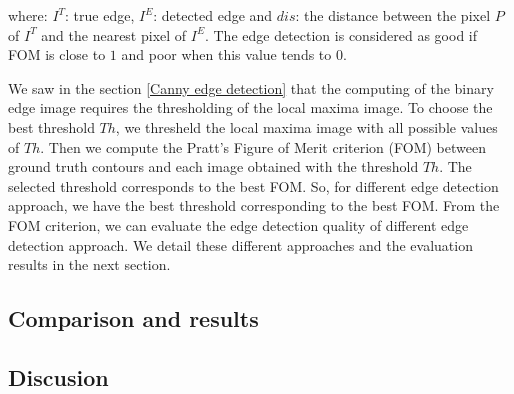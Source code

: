 \documentclass[twoside]{article}
\begin{document}
where: $I^T$: true edge, $I^E$: detected edge and $dis$: the distance between the pixel $P$ of $I^T$ and  the nearest pixel of $I^E$.
The edge detection is considered as good if FOM is close to $1$ and poor when this value tends to $0$.

We saw in the section \ref{Canny edge detection} that the computing of the binary edge image requires the thresholding of the local maxima image. To choose the best threshold $Th$, we thresheld the local maxima image with all possible values of $Th$. Then we compute the Pratt's Figure of Merit criterion (FOM) between ground truth contours and each image obtained with the threshold $Th$. The selected threshold corresponds to the best FOM. So, for different edge detection approach, we have the best threshold corresponding to the best FOM. From the FOM criterion, we can evaluate the edge detection quality of different edge detection approach. We detail these different approaches and the evaluation results in the next section.       





\subsection{Comparison and results}
\label{subsec:Comparison and results}
















\subsection{Discusion}
\label{subsec:Discusion}













\end{document}
